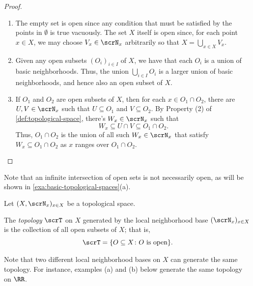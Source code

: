 \begin{proof}

  \leavevmode

  \begin{enumerate}
  \item
    The empty set is open since any condition that must be satisfied by the points in $\emptyset$ is true vacuously.
    The set $X$ itself is open since, for each point $x\in X$, we may choose $V_x\in \scrN_x$ arbitrarily so that $X=\bigcup\limits_{x\in X}V_x$.

  \item
    Given any open subsets $(O_i)_{i\in I}$ of $X$, we have that each $O_i$ is a union of basic neighborhoods.
    Thus, the union $\bigcup\limits_{i\in I}O_i$ is a larger union of basic neighborhoods, and hence also an open subset of $X$.

  \item
    If $O_1$ and $O_2$ are open subsets of $X$, then for each $x\in O_1\cap O_2$, there are $U,V\in \scrN_x$ such that $U\subseteq O_1$ and $V\subseteq O_2$.
    By Property (2) of \cref{def:topological-space}, there’s
    $W_x\in \scrN_x$ such that \[W_x\subseteq U\cap V\subseteq O_1\cap O_2\text{.}\] Thus, $O_1\cap O_2$ is the union of all such $W_x\in \scrN_x$ that satisfy $W_x\subseteq O_1\cap O_2$ as $x$ ranges over $O_1\cap O_2$.
  \end{enumerate}
\end{proof}

Note that an infinite intersection of open sets is not necessarily open, as will be shown in \cref{exa:basic-topological-spaces}(a).

\begin{definition}
  Let $(X, \scrN_x)_{x\in X}$ be a topological space.

  The \emph{topology} $\scrT$ on $X$ generated by the local neighborhood base $(\scrN_x)_{x\in X}$  is the collection of all open subsets of $X$;
  that is,
  \[
    \scrT=
    \{ O\subseteq X \colon O \text{ is open}\}\text{.}
  \]
\end{definition}

Note that two different local neighborhood bases on $X$ can generate the same topology.
For instance, examples (a) and (b) below generate the same topology on $\RR$.

